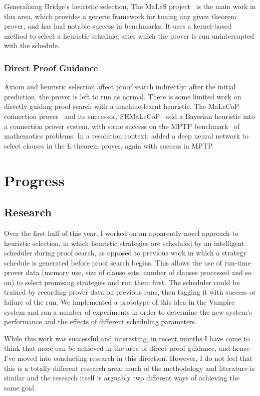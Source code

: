 \documentclass[a4paper, 10pt]{article}
\begin{document}
Generalizing Bridge's heuristic selection, The MaLeS project~\cite{MaLeS} is the main work in this area, which provides a generic framework for tuning any given theorem prover, and has had notable success in benchmarks.
It uses a kernel-based method to select a heuristic schedule, after which the prover is run uninterrupted with the schedule.

\subsubsection{Direct Proof Guidance}
Axiom and heuristic selection affect proof search indirectly: after the initial prediction, the prover is left to run as normal.
There is some limited work on directly guiding proof search with a machine-learnt heuristic.
The MaLeCoP connection prover~\cite{MaLeCoP} and its successor, FEMaLeCoP~\cite{FEMaLeCoP} add a Bayesian heuristic into a connection prover system, with some success on the MPTP benchmark~\cite{MPTP} of mathematics problems.
In a resolution context, \textcite{deep-proof-search} added a deep neural network to select clauses in the E theorem prover, again with success in MPTP.

\section{Progress}
\subsection{Research}
Over the first half of this year, I worked on an apparently-novel approach to heuristic selection, in which heuristic strategies are scheduled by an intelligent scheduler during proof search, as opposed to previous work in which a strategy schedule is generated before proof search begins.
This allows the use of run-time prover data (memory use, size of clause sets, number of clauses processed and so on) to select promising strategies and run them first.
The scheduler could be trained by recording prover data on previous runs, then tagging it with success or failure of the run.
We implemented a prototype of this idea in the Vampire system and ran a number of experiments in order to determine the new system's performance and the effects of different scheduling parameters.

While this work was successful and interesting, in recent months I have come to think that more can be achieved in the area of direct proof guidance, and hence I've moved into conducting research in this direction.
However, I do not feel that this is a totally different research area: much of the methodology and literature is similar and the research itself is arguably two different ways of achieving the same goal.
\end{document}
